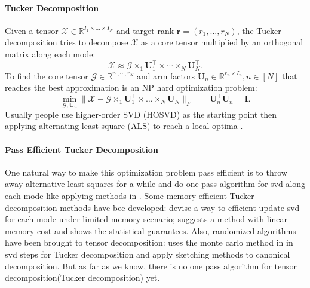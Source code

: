 \paragraph{Tucker Decomposition}
Given a tensor $\mathscr{X}\in\mathbb{R}^{I_1\times \dots \times I_N}$ and target rank $\mathbf{r}=(r_1,\dots, r_N)$, the Tucker decomposition tries to decompose $\mathscr{X}$ as a core tensor multiplied by an orthogonal matrix along each mode:
\begin{equation}
\label{eq:tucker_optimization}
\mathscr{X} \approx \mathscr{G}\times_1 \mathbf{U}_1^\top \times \cdots \times_N \mathbf{U}_N^\top.  
\end{equation}
To find the core tensor $\mathscr{G}\in \mathbb{R}^{r_1,\cdots, r_N}$ and arm factors $\mathbf{U}_n \in \mathbb{R}^{r_n\times I_n}, n\in [N]$ that reaches the best approximation is an NP hard optimization problem: 
\begin{equation}
\label{eq:tucker_optimization}
\min_{\mathscr{G}, \mathbf{U}_n}\|\mathscr{X} - \mathscr{G}\times_1 \mathbf{U}^\top_1\times \dots \times_N \mathbf{U}^\top_N\|_F \qquad \mathbf{U}_n^\top \mathbf{U}_n = \mathbf{I}.
\end{equation}
Usually people use higher-order SVD (HOSVD) \citep{de2000multilinear} as the starting point then applying alternating least square (ALS) to reach a local optima \citep{kroonenberg1980principal}. \par 
\paragraph{Pass Efficient Tucker Decomposition} One natural way to make this optimization problem pass efficient is to throw away alternative least squares for a while and do one pass algorithm for svd along each mode like applying methods in \citep{clarkson2009numerical, tropp2016randomized}. Some memory efficient Tucker decomposition methods have bee developed: \cite{kolda2008scalable} devise a way to efficient update svd for each mode under limited memory scenario;  \cite{wang2016online} suggests a method with linear memory cost and shows the statistical guarantees. Also, randomized algorithms have been brought to tensor decomposition: \cite{tsourakakis2010mach} uses the monte carlo method in  \cite{frieze2004fast} in svd steps for Tucker decomposition and 
\cite{erichson2017randomized} apply sketching methods \citep{halko2011finding} to canonical decomposition. But as far as we know, there is no one pass algorithm for tensor decomposition(Tucker decomposition) yet.
